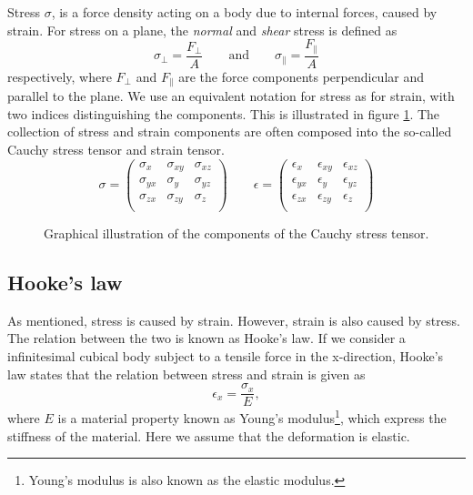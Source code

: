 \documentclass[twoside,english]{uiofysmaster}
\begin{document}
Stress $\sigma$, is a force density acting on a body due to internal forces, caused by strain.
For stress on a plane, the \textit{normal} and \textit{shear} stress is defined as
\begin{equation}
\sigma_\perp = \frac{F_\perp}{A} \qquad \text{and} \qquad \sigma_\parallel = \frac{F_\parallel}{A}
\end{equation}
respectively, where $F_\perp$ and $F_\parallel$ are the force components perpendicular and parallel to the plane.
We use an equivalent notation for stress as for strain, with two indices distinguishing the components.
This is illustrated in figure \ref{fig:stressTensor}.
The collection of stress and strain components are often composed into the so-called Cauchy stress tensor and strain tensor.
\begin{equation}
\sigma = 
\begin{pmatrix}
\sigma_{x} & \sigma_{xy} & \sigma_{xz} \\
\sigma_{yx} & \sigma_{y} & \sigma_{yz} \\
\sigma_{zx} & \sigma_{zy} & \sigma_{z} \\
\end{pmatrix}
\qquad
\epsilon = 
\begin{pmatrix}
\epsilon_{x} & \epsilon_{xy} & \epsilon_{xz} \\
\epsilon_{yx} & \epsilon_{y} & \epsilon_{yz} \\
\epsilon_{zx} & \epsilon_{zy} & \epsilon_{z} \\
\end{pmatrix}
\end{equation}

\begin{figure}
	\center
	\resizebox{0.5\linewidth}{!}{
		
	}
	\caption{Graphical illustration of the components of the Cauchy stress tensor.}
	\label{fig:stressTensor}
\end{figure}


\subsection{Hooke's law}
As mentioned, stress is caused by strain. However, strain is also caused by stress. 
The relation between the two is known as Hooke's law. 
If we consider a infinitesimal cubical body subject to a tensile force in the x-direction, Hooke's law states that the relation between stress and strain is given as
\begin{equation}
\epsilon_x = \frac{\sigma_x}{E}, \label{eq:stressStrainHookesLawX}
\end{equation}
where $E$ is a material property known as Young's modulus\footnote{Young's modulus is also known as the elastic modulus.}, which express the stiffness of the material. 
Here we assume that the deformation is elastic.
\end{document}
